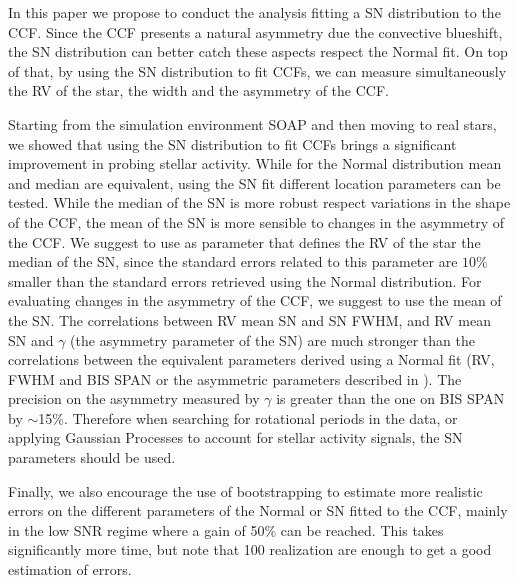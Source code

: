 \documentclass[11pt, oneside]{article}
\begin{document}
{In this paper we propose to conduct the analysis fitting a SN distribution to the CCF. Since the CCF presents a natural asymmetry due the convective blueshift, the SN distribution can better catch these aspects respect the Normal fit. On top of that, by using the SN distribution to fit CCFs, we can measure simultaneously the RV of the star, the width and the asymmetry of the CCF.

Starting from the simulation environment SOAP and then moving to real stars, we showed that using the SN distribution to fit CCFs brings a significant improvement in probing stellar activity. While for the Normal distribution mean and median are equivalent, using the SN fit different location parameters can be tested. While the median of the SN is more robust respect variations in the shape of the CCF, the mean of the SN is more sensible to changes in the asymmetry of the CCF. We suggest to use as parameter that defines the RV of the star the median of the SN, since the standard errors related to this parameter are $10\%$ smaller than the standard errors retrieved using the Normal distribution. For evaluating changes in the asymmetry of the CCF, we suggest to use the mean of the SN. The correlations between RV mean SN and SN FWHM, and RV mean SN and $\gamma$ (the asymmetry parameter of the SN) are much stronger than the correlations between the equivalent parameters derived using a Normal fit (RV, FWHM and BIS SPAN or the asymmetric parameters described in \citet{Figueira-2013}). The precision on the asymmetry measured by $\gamma$ is greater than the one on BIS SPAN by $\sim$15\%. Therefore when searching for rotational periods in the data, or applying Gaussian Processes to account for stellar activity signals, the SN parameters should be used.

Finally, we also encourage the use of bootstrapping to estimate more realistic errors on the different parameters of the Normal or SN fitted to the CCF, mainly in the low SNR regime where a gain of 50\% can be reached. This takes significantly more time, but note that 100 realization are enough to get a good estimation of errors.



}
\end{document}
